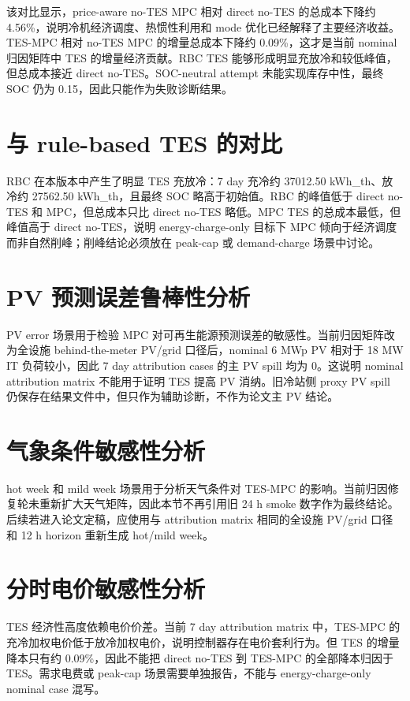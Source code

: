 \documentclass[UTF8,a4paper,12pt]{ctexrep}
\begin{document}
该对比显示，price-aware no-TES MPC 相对 direct no-TES 的总成本下降约 4.56\%，说明冷机经济调度、热惯性利用和 mode 优化已经解释了主要经济收益。TES-MPC 相对 no-TES MPC 的增量总成本下降约 0.09\%，这才是当前 nominal 归因矩阵中 TES 的增量经济贡献。RBC TES 能够形成明显充放冷和较低峰值，但总成本接近 direct no-TES。SOC-neutral attempt 未能实现库存中性，最终 SOC 仍为 0.15，因此只能作为失败诊断结果。

\section{与 rule-based TES 的对比}

RBC 在本版本中产生了明显 TES 充放冷：7 day 充冷约 37012.50 kWh\_th、放冷约 27562.50 kWh\_th，且最终 SOC 略高于初始值。RBC 的峰值低于 direct no-TES 和 MPC，但总成本只比 direct no-TES 略低。MPC TES 的总成本最低，但峰值高于 direct no-TES，说明 energy-charge-only 目标下 MPC 倾向于经济调度而非自然削峰；削峰结论必须放在 peak-cap 或 demand-charge 场景中讨论。

\section{PV 预测误差鲁棒性分析}

PV error 场景用于检验 MPC 对可再生能源预测误差的敏感性。当前归因矩阵改为全设施 behind-the-meter PV/grid 口径后，nominal 6 MWp PV 相对于 18 MW IT 负荷较小，因此 7 day attribution cases 的主 PV spill 均为 0。这说明 nominal attribution matrix 不能用于证明 TES 提高 PV 消纳。旧冷站侧 proxy PV spill 仍保存在结果文件中，但只作为辅助诊断，不作为论文主 PV 结论。

\section{气象条件敏感性分析}

hot week 和 mild week 场景用于分析天气条件对 TES-MPC 的影响。当前归因修复轮未重新扩大天气矩阵，因此本节不再引用旧 24 h smoke 数字作为最终结论。后续若进入论文定稿，应使用与 attribution matrix 相同的全设施 PV/grid 口径和 12 h horizon 重新生成 hot/mild week。

\section{分时电价敏感性分析}

TES 经济性高度依赖电价价差。当前 7 day attribution matrix 中，TES-MPC 的充冷加权电价低于放冷加权电价，说明控制器存在电价套利行为。但 TES 的增量降本只有约 0.09\%，因此不能把 direct no-TES 到 TES-MPC 的全部降本归因于 TES。需求电费或 peak-cap 场景需要单独报告，不能与 energy-charge-only nominal case 混写。
\end{document}
